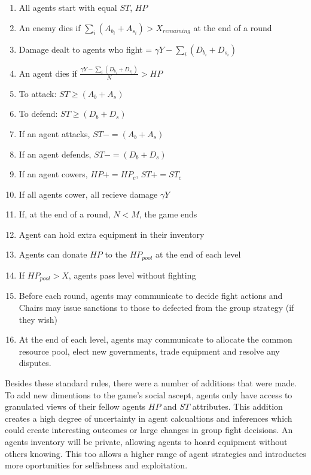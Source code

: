 \begin{enumerate}
    \item All agents start with equal $ST$, $HP$
    \item An enemy dies if $\sum_{i} (A_b_i + A_s_i) > X_{remaining}$ at the end of a round
    \item Damage dealt to agents who fight = $\gamma Y - \sum_{i} (D_b_i + D_s_i)$ 
    \item An agent dies if $\frac{\gamma Y - \sum_{i} (D_b_i + D_s_i)}{N} > HP$
    \item To attack: $ST \geq (A_b + A_s)$
    \item To defend: $ST \geq (D_b + D_s)$
    \item If an agent attacks, $ST -= (A_b + A_s)$
    \item If an agent defends, $ST -= (D_b + D_s)$
    \item If an agent cowers, $HP += HP_c$, $ST += ST_c$
    \item If all agents cower, all recieve damage $\gamma Y$
    \item If, at the end of a round, $N<M$, the game ends 

    \item Agent can hold extra equipment in their inventory
    \item Agents can donate $HP$ to the $HP_{pool}$ at the end of each level
    \item If $HP_{pool} > X$, agents pass level without fighting

    \item Before each round, agents may communicate to decide fight actions and Chairs may issue sanctions to those to defected from the group strategy (if they wish)
    \item At the end of each level, agents may communicate to allocate the common resource pool, elect new governments, trade equipment and resolve any disputes.


\end{enumerate}


Besides these standard rules, there were a number of additions that were made. To add new dimentions to the game's social ascept, agents only have access to granulated views of their fellow agents $HP$ and $ST$ attributes. This addition creates a high degree of uncertainty in agent calcualtions and inferences which could create interesting outcomes or large changes in group fight decisions. An agents inventory will be private, allowing agents to hoard equipment without others knowing. This too allows a higher range of agent strategies and introductes more oportunities for selfishness and exploitation. 

